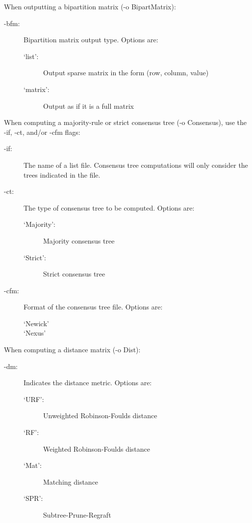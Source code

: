 \documentclass[11pt]{article}
\begin{document}
\begin{enumerate}[{\bf (1)}]
\vspace{0.5cm}

When outputting a bipartition matrix (-o BipartMatrix):
	\begin{description}
	\item[-bfm:] Bipartition matrix output type. Options are: 
		\begin{description}
		\item[`list':] Output sparse matrix in the form (row, column, value)
		\item[`matrix':] Output as if it is a full matrix
		\end{description}
	\end{description}
	
\vspace{0.5cm}
		
When computing a majority-rule or strict consensus tree (-o Consensus), use the -if, -ct,
and/or -cfm flags:
	\begin{description}
	\item[-if:] The name of a list file. Consensus tree computations will only consider the trees indicated in the file.
	
	\item[-ct:] The type of consensus tree to be computed. Options are:
		\begin{description}
		\item[`Majority':] Majority consensus tree
		\item[`Strict':] Strict consensus tree
		\end{description}
	
	\item[-cfm:] Format of the consensus tree file. Options are:
		\begin{description}
		\item[`Newick']
		\item[`Nexus']
		\end{description}
	\end{description}

\vspace{0.5cm}
	
When computing a distance matrix (-o Dist):
	\begin{description}
	\item[-dm:] Indicates the distance metric. Options are:
		\begin{description}
		\item[`URF':] Unweighted Robinson-Foulds distance
		\item[`RF':] Weighted Robinson-Foulds distance
		\item[`Mat':] Matching distance
		\item[`SPR':] Subtree-Prune-Regraft
		\end{description}
	\end{description} 


\end{enumerate}
\end{document}
